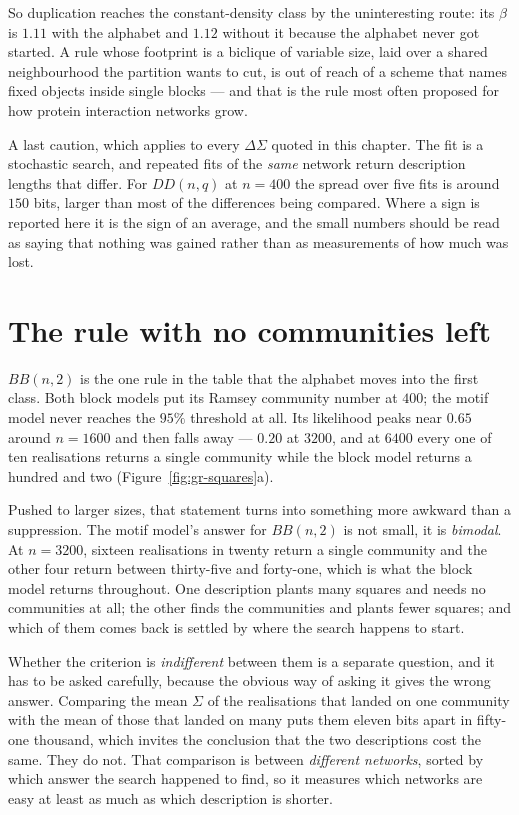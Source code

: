So duplication reaches the constant-density class by the uninteresting route: its
$\beta$ is $1.11$ with the alphabet and $1.12$ without it because the alphabet
never got started. A rule whose footprint is a biclique of variable size, laid
over a shared neighbourhood the partition wants to cut, is out of reach of a
scheme that names fixed objects inside single blocks --- and that is the rule
most often proposed for how protein interaction networks grow.

A last caution, which applies to every $\Delta\Sigma$ quoted in this chapter. The
fit is a stochastic search, and repeated fits of the \emph{same} network return
description lengths that differ. For $DD(n,q)$ at $n=400$ the spread over five
fits is around $150$ bits, larger than most of the differences being compared.
Where a sign is reported here it is the sign of an average, and the small numbers
should be read as saying that nothing was gained rather than as measurements of
how much was lost.

\section{The rule with no communities left}
\label{sec:gr-none}

$BB(n,2)$ is the one rule in the table that the alphabet moves into the first
class. Both block models put its Ramsey community number at $400$; the motif
model never reaches the $95\%$ threshold at all. Its likelihood peaks near $0.65$
around $n=1600$ and then falls away --- $0.20$ at $3200$, and at $6400$ every one
of ten realisations returns a single community while the block model returns a
hundred and two (Figure~\ref{fig:gr-squares}a).

Pushed to larger sizes, that statement turns into something more awkward than a
suppression. The motif model's answer for $BB(n,2)$ is not small, it is
\emph{bimodal}. At $n=3200$, sixteen realisations in twenty return a single
community and the other four return between thirty-five and forty-one, which is
what the block model returns throughout. One description plants many squares and
needs no communities at all; the other finds the communities and plants fewer
squares; and which of them comes back is settled by where the search happens to
start.

Whether the criterion is \emph{indifferent} between them is a separate question,
and it has to be asked carefully, because the obvious way of asking it gives the
wrong answer. Comparing the mean $\Sigma$ of the realisations that landed on one
community with the mean of those that landed on many puts them eleven bits apart
in fifty-one thousand, which invites the conclusion that the two descriptions
cost the same. They do not. That comparison is between \emph{different networks},
sorted by which answer the search happened to find, so it measures which networks
are easy at least as much as which description is shorter.

